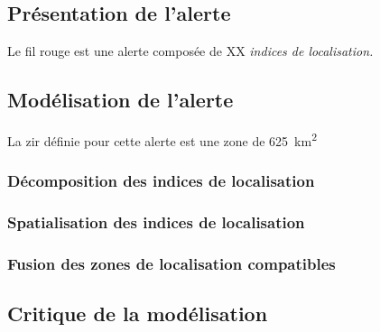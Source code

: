 \subsection{Présentation de l'alerte}
\label{subsec:9-3-1}

Le fil rouge est une alerte composée de XX \emph{indices de
  localisation.}

\subsection{Modélisation de l'alerte}
\label{subsec:9-3-2}

La \ac{zir} définie pour cette alerte est une zone de
\SI{625}{\kilo\meter\squared}

\subsubsection{Décomposition des indices de localisation}
\label{subsec:9-3-2-1}

\subsubsection{Spatialisation des indices de localisation}
\label{subsec:9-3-2-2}

\subsubsection{Fusion des zones de localisation compatibles}
\label{subsec:9-3-2-3}

\subsection{Critique de la modélisation}
\label{subsec:9-3-3}


